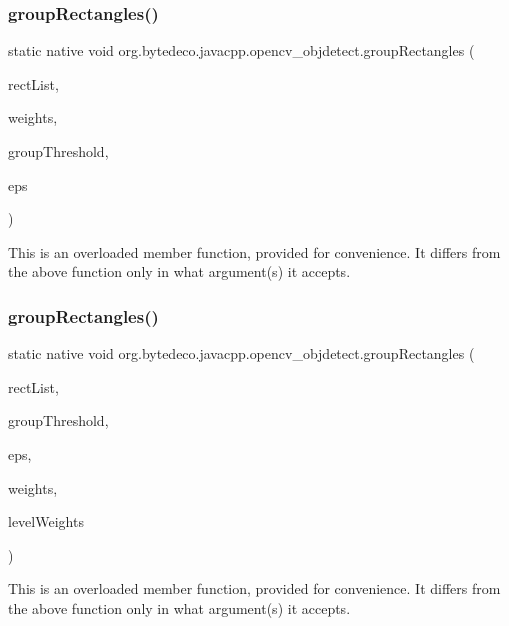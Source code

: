 \subsubsection{\texorpdfstring{group\+Rectangles()}{groupRectangles()}\hspace{0.1cm}{\footnotesize\ttfamily [2/4]}}
{\footnotesize\ttfamily static native void org.\+bytedeco.\+javacpp.\+opencv\+\_\+objdetect.\+group\+Rectangles (\begin{DoxyParamCaption}\item[{@By\+Ref Rect\+Vector}]{rect\+List,  }\item[{@Std\+Vector Int\+Pointer}]{weights,  }\item[{int}]{group\+Threshold,  }\item[{double}]{eps }\end{DoxyParamCaption})\hspace{0.3cm}{\ttfamily [static]}}

This is an overloaded member function, provided for convenience. It differs from the above function only in what argument(s) it accepts. \mbox{\label{group__objdetect_ga48da69f02f512561ce6524dfe4508d0d}} 
\subsubsection{\texorpdfstring{group\+Rectangles()}{groupRectangles()}\hspace{0.1cm}{\footnotesize\ttfamily [3/4]}}
{\footnotesize\ttfamily static native void org.\+bytedeco.\+javacpp.\+opencv\+\_\+objdetect.\+group\+Rectangles (\begin{DoxyParamCaption}\item[{@By\+Ref Rect\+Vector}]{rect\+List,  }\item[{int}]{group\+Threshold,  }\item[{double}]{eps,  }\item[{@Std\+Vector Int\+Pointer}]{weights,  }\item[{@Std\+Vector Double\+Pointer}]{level\+Weights }\end{DoxyParamCaption})\hspace{0.3cm}{\ttfamily [static]}}

This is an overloaded member function, provided for convenience. It differs from the above function only in what argument(s) it accepts. \mbox{\label{group__objdetect_ga0a844bdf309e1f0b6a11e2622edf3548}} 

